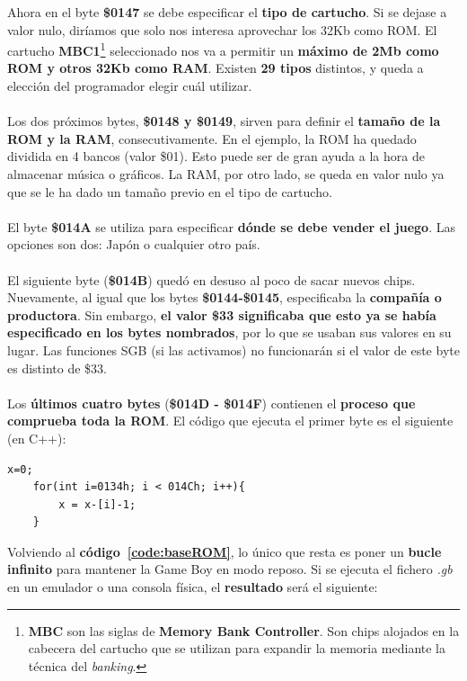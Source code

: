 Ahora en el byte \textbf{\$0147} se debe especificar el \textbf{tipo de cartucho}. Si se dejase a valor nulo, diríamos que solo nos interesa aprovechar los 32Kb como ROM. El cartucho \textbf{MBC1}\footnote{\textbf{MBC} son las siglas de \textbf{Memory Bank Controller}. Son chips alojados en la cabecera del cartucho que se utilizan para expandir la memoria mediante la técnica del  \textit{banking}.} seleccionado nos va a permitir un \textbf{máximo de 2Mb como ROM y otros 32Kb como RAM}. Existen \textbf{29 tipos} distintos, y queda a elección del programador elegir cuál utilizar.
\\ \\
Los dos próximos bytes, \textbf{\$0148 y \$0149}, sirven para definir el \textbf{tamaño de la ROM y la RAM}, consecutivamente. En el ejemplo, la ROM ha quedado dividida en 4 bancos (valor \$01). Esto puede ser de gran ayuda a la hora de almacenar música o gráficos. La RAM, por otro lado, se queda en valor nulo ya que se le ha dado un tamaño previo en el tipo de cartucho.
\\ \\
El byte \textbf{\$014A} se utiliza para especificar \textbf{dónde se debe vender el juego}. Las opciones son dos: Japón o cualquier otro país.
\\ \\
El siguiente byte (\textbf{\$014B}) quedó en desuso al poco de sacar nuevos chips. Nuevamente, al igual que los bytes \textbf{\$0144-\$0145}, especificaba la \textbf{compañía o productora}. Sin embargo, \textbf{el valor \$33 significaba que esto ya se había especificado en los bytes nombrados}, por lo que se usaban sus valores en su lugar. Las funciones SGB (si las activamos) no funcionarán si el valor de este byte es distinto de \$33.
\\ \\
Los \textbf{últimos cuatro bytes} (\textbf{\$014D - \$014F}) contienen el \textbf{proceso que comprueba toda la ROM}. El código que ejecuta el primer byte es el siguiente (en C++):

\begin{lstlisting}[caption={Comprobación de la ROM}, label={code:checksum}]
    x=0;
    for(int i=0134h; i < 014Ch; i++){
        x = x-[i]-1;
    }
\end{lstlisting}

\clearpage

Volviendo al \textbf{código~\ref{code:baseROM}}, lo único que resta es poner un \textbf{bucle infinito} para mantener la Game Boy en modo reposo. Si se ejecuta el fichero \textit{.gb} en un emulador o una consola física, el \textbf{resultado} será el siguiente:

